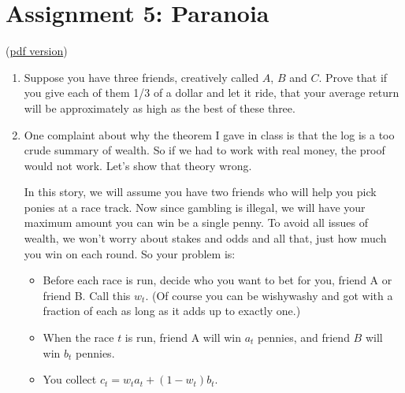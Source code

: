 \documentclass[12pt]{extarticle}
\begin{document}
\section*{Assignment 5: Paranoia}


(\href{assignment5.pdf}{pdf version}) 

\begin{enumerate}
\item Suppose you have three friends, creatively called $A$, $B$ and
$C$.  Prove that if you give each of them 1/3 of a dollar and let it
ride, that your average return will be approximately as high as the
best of these three.

\item One complaint about why the theorem I gave in class is that
the log is a too crude summary of wealth.  So if we had to work with
real money, the proof would not work.  Let's show that theory wrong.

In this story, we will assume you have two friends who will help you
pick ponies at a race track.  Now since gambling is illegal, we will
have your maximum amount you can win be a single penny.  To avoid all
issues of wealth, we won't worry about stakes and odds and all that,
just how much you win on each round.  So your problem is:

\begin{itemize}
\item Before each race is run, decide who you want to bet for you,
 friend A or friend B.  Call this $w_t$.  (Of course you can be
 wishywashy and got with a fraction of each as long as it adds up to
 exactly one.)
\item When the race $t$ is run, friend A will win $a_t$ pennies, and
friend $B$ will win $b_t$ pennies.
\item You collect $c_t = w_t a_t + (1-w_t) b_t$.
\end{itemize}


\end{enumerate}
\end{document}
